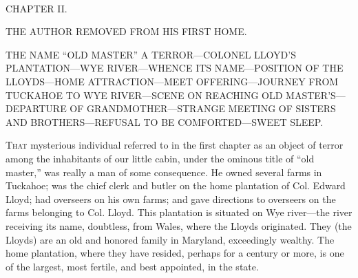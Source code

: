 {}

~

{CHAPTER II.}

THE AUTHOR REMOVED FROM HIS FIRST HOME.

{THE NAME ``OLD MASTER'' A TERROR---COLONEL LLOYD'S PLANTATION---WYE
RIVER---WHENCE ITS NAME---POSITION OF THE LLOYDS---HOME
ATTRACTION---MEET OFFERING---JOURNEY FROM TUCKAHOE TO WYE RIVER---SCENE
ON REACHING OLD MASTER'S---DEPARTURE OF GRANDMOTHER---STRANGE MEETING OF
SISTERS AND BROTHERS---REFUSAL TO BE COMFORTED---SWEET SLEEP.}

\textsc{That} mysterious individual referred to in the first chapter as
an object of terror among the inhabitants of our little cabin, under the
ominous title of ``old master,'' was really a man of some consequence.
He owned several farms in Tuckahoe; was the chief clerk and butler on
the home plantation of Col. Edward Lloyd; had overseers on his own
farms; and gave directions to overseers on the farms belonging to Col.
Lloyd. This plantation is situated on Wye river---the river receiving
its name, doubtless, from Wales, where the Lloyds originated. They (the
Lloyds) are an old and honored family in Maryland, exceedingly wealthy.
The home plantation, where they have resided, perhaps for a century or
more, is one of the largest, most fertile, and best appointed, in the
state.

